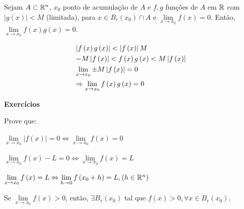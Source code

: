 \documentclass{book}
\begin{document}
\begin{cor}
    Sejam $A \subset \mathbb{R}^n$, $x_0$ ponto de acumula\c c\~ao de $A$ e $f,g$ fun\c c\~oes de $A$ em $\mathbb{R}$ com $\left| {g\left( x \right)} \right| < M$ (limitada), para $x \in B_r \left( {x_0 } \right) \cap A$ e $\mathop {\lim }\limits_{x \to x_0 } f\left( x \right) = 0$. Ent\~ao, $\mathop {\lim }\limits_{x \to x_0 } f\left( x \right)g\left( x \right) = 0$.
\end{cor}

\begin{dem}
\[
\begin{gathered}
  \left| {f\left( x \right)g\left( x \right)} \right| < \left| {f\left( x \right)} \right|M \hfill \\
   - M\left| {f\left( x \right)} \right| < f\left( x \right)g\left( x \right) < M\left| {f\left( x \right)} \right| \hfill \\
  \mathop {\lim }\limits_{x \to x_0 }  \pm M\left| {f\left( x \right)} \right| = 0 \hfill \\
   \Rightarrow \mathop {\lim }\limits_{x \to x_0 } f\left( x \right)g\left( x \right) = 0 \hfill \\
\end{gathered}
\]

\end{dem}

\textbf{Exerc\'icios}

Prove que:

\begin{exerc}
    $\mathop {\lim }\limits_{x \to x_0 } \left| {f\left( x \right)} \right| = 0 \Leftrightarrow \mathop {\lim }\limits_{x \to x_0 } f\left( x \right) = 0$
\end{exerc}

\begin{exerc}
    $\mathop {\lim }\limits_{x \to x_0 } f\left( x \right) - L = 0 \Leftrightarrow \mathop {\lim }\limits_{x \to x_0 } f\left( x \right) = L$
\end{exerc}

\begin{exerc}
    $\mathop {\lim }\limits_{x \to x_0 } f\left( x \right) = L \Leftrightarrow \mathop {\lim }\limits_{h \to 0} f\left( {x_0  + h} \right) = L,\left( {h \in \mathbb{R}^n } \right)$
\end{exerc}

\begin{exerc}
    Se $\mathop {\lim }\limits_{x \to x_0 } f\left( x \right) > 0$, ent\~ao, $\exists B_r \left( {x_0 } \right)$ tal que $f\left( x \right) > 0,\forall x \in B_r \left( {x_0 } \right)$.
\end{exerc}
\end{document}
